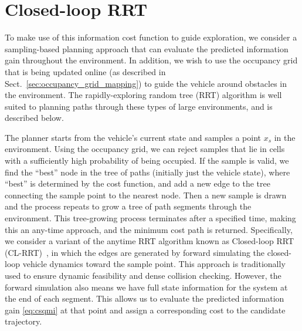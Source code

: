 \section{Closed-loop RRT}
\label{sec:planner}

To make use of this information cost function to guide exploration, we consider a sampling-based planning approach that can evaluate the predicted information gain throughout the environment. In addition, we wish to use the occupancy grid that is being updated online (as described in Sect.~\ref{sec:occupancy_grid_mapping}) to guide the vehicle around obstacles in the environment. The rapidly-exploring random tree (RRT) algorithm is well suited to planning paths through these types of large environments, and is described below. 

The planner starts from the vehicle's current state and samples a point $x_s$ in the environment. Using the occupancy grid, we can reject samples that lie in cells with a sufficiently high probability of being occupied. If the sample is valid, we find the ``best'' node in the tree of paths (initially just the vehicle state), where ``best'' is determined by the cost function, and add a new edge to the tree connecting the sample point to the nearest node.
Then a new sample is drawn and the process repeats to grow a tree of path segments through the environment. This tree-growing process terminates after a specified time, making this an any-time approach, and the minimum cost path is returned. Specifically, we consider a variant of the anytime RRT algorithm known as Closed-loop RRT (CL-RRT)~\cite{Kuwata09_TCST}, in which the edges are generated by forward simulating the closed-loop vehicle dynamics toward the sample point. This approach is traditionally used to ensure dynamic feasibility and dense collision checking. However, the forward simulation also means we have full state information for the system at the end of each segment. This allows us to evaluate the predicted information gain \eqref{eq:csqmi} at that point and assign a corresponding cost to the candidate trajectory.

